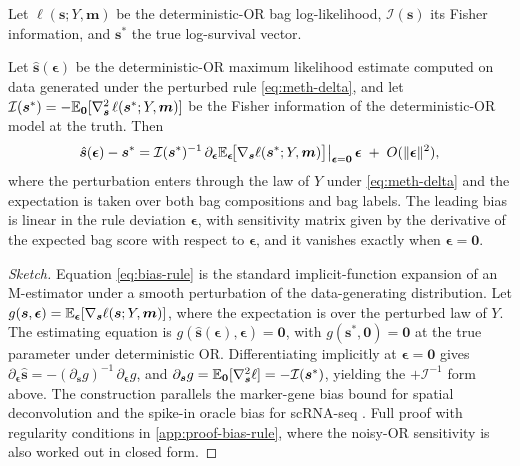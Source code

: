 Let $\ell(\bm{s}; Y, \bm{m})$ be the deterministic-OR bag
log-likelihood, $\mathcal{I}(\bm{s})$ its Fisher information, and
$\bm{s}^*$ the true log-survival vector.

\begin{theorem}
\label{thm:bias-rule}
Let $\hat{\bm{s}}(\bm{\epsilon})$ be the deterministic-OR maximum
likelihood estimate computed on data generated under the perturbed
rule \eqref{eq:meth-delta}, and let
$\mathcal{I}(\bm{s}^*) = -\mathbb{E}_{\bm{0}}[\nabla^2_{\bm{s}}\,
\ell(\bm{s}^*; Y, \bm{m})]$ be the Fisher information of the
deterministic-OR model at the truth. Then
\begin{equation}
  \hat{\bm{s}}(\bm{\epsilon}) - \bm{s}^*
  = \mathcal{I}(\bm{s}^*)^{-1}\,
     \partial_{\bm{\epsilon}} \mathbb{E}_{\bm{\epsilon}}\!\big[
       \nabla_{\bm{s}}\ell(\bm{s}^*; Y, \bm{m}) \big]
     \big|_{\bm{\epsilon}=\bm{0}}
     \,\bm{\epsilon}
  \;+\; O(\|\bm{\epsilon}\|^2),
  \label{eq:bias-rule}
\end{equation}
where the perturbation enters through the law of $Y$ under
\eqref{eq:meth-delta} and the expectation is taken over both bag
compositions and bag labels. The leading bias is linear in the rule
deviation $\bm{\epsilon}$, with sensitivity matrix given by the
derivative of the expected bag score with respect to $\bm{\epsilon}$,
and it vanishes exactly when $\bm{\epsilon} = \bm{0}$.
\end{theorem}

\begin{proof}[Sketch]
Equation \eqref{eq:bias-rule} is the standard implicit-function
expansion of an M-estimator under a smooth perturbation of the
data-generating distribution. Let
$g(\bm{s}, \bm{\epsilon}) = \mathbb{E}_{\bm{\epsilon}}[\nabla_{\bm{s}}
\ell(\bm{s}; Y, \bm{m})]$, where the expectation is over the
perturbed law of $Y$. The estimating equation is
$g(\hat{\bm{s}}(\bm{\epsilon}), \bm{\epsilon}) = \bm{0}$, with
$g(\bm{s}^*, \bm{0}) = \bm{0}$ at the true parameter under
deterministic OR. Differentiating implicitly at $\bm{\epsilon}=\bm{0}$
gives $\partial_{\bm{\epsilon}}\hat{\bm{s}} = -(\partial_{\bm{s}}
g)^{-1}\,\partial_{\bm{\epsilon}} g$, and
$\partial_{\bm{s}} g = \mathbb{E}_{\bm{0}}[\nabla^2_{\bm{s}}\ell] =
-\mathcal{I}(\bm{s}^*)$, yielding the $+\mathcal{I}^{-1}$ form
above. The construction parallels the marker-gene bias bound for
spatial deconvolution \cite[\S 5]{towell2026spatialcoarsening} and
the spike-in oracle bias for scRNA-seq
\cite[\S 7]{towell2026scrnacoarsening}. Full proof with regularity
conditions in \cref{app:proof-bias-rule}, where the noisy-OR
sensitivity is also worked out in closed form.
\end{proof}

